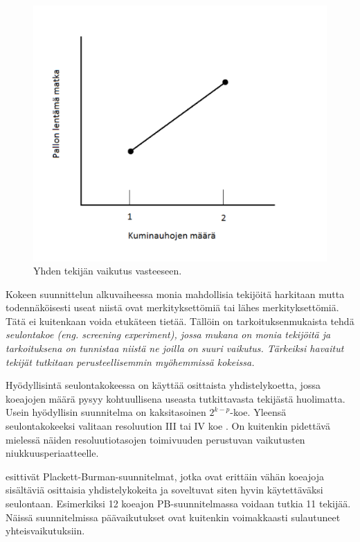 \documentclass[12pt,a4paper,finnish]{tutthesis}
\begin{document}
\begin{figure}
  \begin{center}
    \includegraphics[scale=0.6]{vaikutus}
  \end{center}
  \caption[Tekijän vaikutuskuvaaja]{Yhden tekijän vaikutus vasteeseen.}
  \label{fig:vaikutus}
\end{figure}


Kokeen suunnittelun alkuvaiheessa monia mahdollisia tekijöitä harkitaan
mutta todennäköisesti useat niistä ovat merkityksettömiä tai lähes
merkityksettömiä. Tätä ei kuitenkaan voida etukäteen tietää. Tällöin
on tarkoituksenmukaista tehdä \em seulontakoe \em
(eng. screening experiment), jossa mukana on monia tekijöitä
ja tarkoituksena on tunnistaa niistä ne joilla on suuri vaikutus.
Tärkeiksi havaitut tekijät tutkitaan perusteellisemmin myöhemmissä
kokeissa.

Hyödyllisintä seulontakokeessa on käyttää osittaista
yhdistelykoetta, jossa koeajojen määrä pysyy kohtuullisena
useasta tutkittavasta tekijästä huolimatta.
Usein hyödyllisin suunnitelma on kaksitasoinen \(2^{k - p}\)-koe.
Yleensä seulontakokeeksi valitaan
resoluution III tai IV koe \parencite[s.~9]{montgomery2006}.
On kuitenkin pidettävä mielessä näiden resoluutiotasojen
toimivuuden perustuvan vaikutusten niukkuusperiaatteelle.

\textcite{plackett1946} esittivät Plackett-Burman-suunnitelmat,
jotka ovat erittäin vähän koeajoja sisältäviä osittaisia yhdistelykokeita
ja soveltuvat siten hyvin käytettäväksi seulontaan. Esimerkiksi 12 koeajon
PB-suunnitelmassa voidaan tutkia 11 tekijää. Näissä suunnitelmissa
päävaikutukset ovat kuitenkin voimakkaasti sulautuneet yhteisvaikutuksiin.
\end{document}
